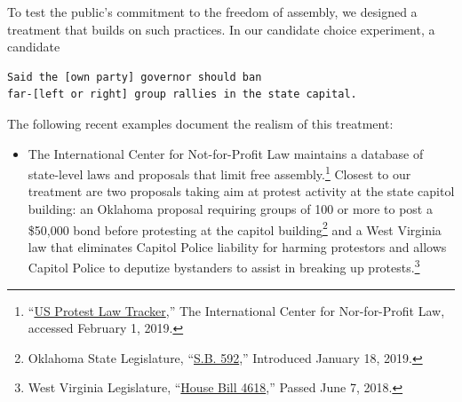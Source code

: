 \documentclass[12pt]{article}
\begin{document}
To test the public's commitment to the freedom of assembly, we designed a treatment that builds on such practices. In our candidate choice experiment, a candidate
\begin{center}
\begin{varwidth}{\linewidth}
\begin{verbatim}
Said the [own party] governor should ban
far-[left or right] group rallies in the state capital.
\end{verbatim}
\end{varwidth}
\end{center}

The following recent examples document the realism of this treatment:

\begin{itemize}
\item The International Center for Not-for-Profit Law maintains a database of state-level laws and proposals that limit free assembly.\footnote{``\href{http://www.icnl.org/usprotestlawtracker/}{US Protest Law Tracker},'' The International Center for Nor-for-Profit Law, accessed February 1, 2019.} Closest to our treatment are two proposals taking aim at protest activity at the state capitol building: an Oklahoma proposal requiring groups of 100 or more to post a \$50,000 bond before protesting at the capitol building\footnote{Oklahoma State Legislature, ``\href{http://www.oklegislature.gov/BillInfo.aspx?Bill=SB592&Session=1900}{S.B. 592},'' Introduced January 18, 2019.} and a West Virginia law that eliminates Capitol Police liability for harming protestors and allows Capitol Police to deputize bystanders to assist in breaking up protests.\footnote{West Virginia Legislature, ``\href{http://www.wvlegislature.gov/Bill_Status/bills_history.cfm?INPUT=4618&year=2018&sessiontype=RS}{House Bill 4618},'' Passed June 7, 2018.}

\end{itemize}
\end{document}
